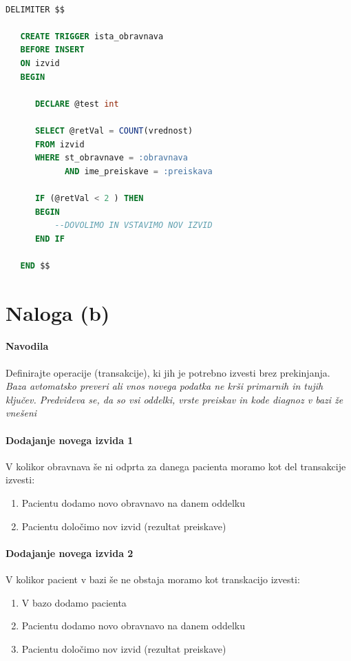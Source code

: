 \documentclass[a4paper,12pt]{report}
\begin{document}
\paragraph{}\mbox{}
\begin{lstlisting}[language = SQL]
   DELIMITER $$

   CREATE TRIGGER ista_obravnava
   BEFORE INSERT
   ON izvid
   BEGIN

      DECLARE @test int

      SELECT @retVal = COUNT(vrednost) 
      FROM izvid
      WHERE st_obravnave = :obravnava 
            AND ime_preiskave = :preiskava

      IF (@retVal < 2 ) THEN
      BEGIN
          --DOVOLIMO IN VSTAVIMO NOV IZVID
      END IF
   
   END $$

\end{lstlisting}

\section*{Naloga (b)}
\paragraph{Navodila}
Definirajte operacije (transakcije), ki jih je potrebno izvesti brez prekinjanja.
\textit{Baza avtomatsko preveri ali vnos novega podatka ne krši primarnih in tujih ključev. Predvideva se, da so vsi oddelki, vrste preiskav in kode diagnoz v bazi že vnešeni}

\paragraph{Dodajanje novega izvida 1}
V kolikor obravnava še ni odprta za danega pacienta moramo kot del transakcije izvesti:
\begin{enumerate}
   \item Pacientu dodamo novo obravnavo na danem oddelku
   \item Pacientu določimo nov izvid (rezultat preiskave)
\end{enumerate}

\paragraph{Dodajanje novega izvida 2}
V kolikor pacient v bazi še ne obstaja moramo kot transkacijo izvesti:
\begin{enumerate}
   \item V bazo dodamo pacienta
   \item Pacientu dodamo novo obravnavo na danem oddelku
   \item Pacientu določimo nov izvid (rezultat preiskave)
\end{enumerate}
\end{document}
